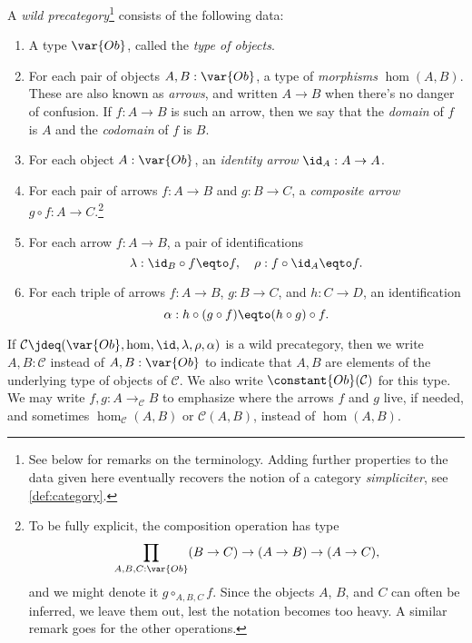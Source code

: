 \begin{definition}\label{def:wild-cat}
  A \emph{wild precategory}\footnote{%
    See below for remarks on the terminology.
    Adding further properties to the data given here eventually
    recovers the notion of a category \emph{simpliciter},
    see \cref{def:category}.}
  consists of the following data:
  \begin{enumerate}
  \item\label{struc:cat-ob} A type $\var{Ob}$, called the \emph{type of objects}.
  \item\label{struc:cat-mor} For each pair of objects $A,B : \var{Ob}$,
    a type of \emph{morphisms} $\hom(A,B)$. These are also known as \emph{arrows},
    and written $A \to B$ when there's no danger of confusion.
    If $f : A \to B$ is such an arrow, then we say that the \emph{domain} of $f$ is $A$
    and the \emph{codomain} of $f$ is $B$.
  \item\label{struc:cat-id} For each object $A : \var{Ob}$,
    an \emph{identity arrow} $\id_A : A \to A$.
  \item\label{struc:cat-comp} For each pair of arrows $f : A \to B$ and $g : B \to C$,
    a \emph{composite arrow} $g\circ f : A \to C$.\footnote{%
      To be fully explicit, the composition operation has
      type
      \[
        \prod_{A,B,C:\var{Ob}}(B \to C) \to (A \to B) \to (A \to C),
      \]
      and we might denote it $g \circ_{A,B,C} f$.
      Since the objects $A$, $B$, and $C$ can often be inferred,
      we leave them out, lest the notation becomes too heavy.
      A similar remark goes for the other operations.}
  \item\label{struc:cat-unit-laws} For each arrow $f : A \to B$,
    a pair of identifications
    \[
      \lambda : \id_B \circ f \eqto f, \quad
      \rho : f \circ \id_A \eqto f.
    \]
  \item\label{struct:cat-assoc} For each triple of arrows
    $f : A \to B$, $g : B \to C$, and $h : C \to D$, an identification
    \[
      \alpha : h \circ (g \circ f) \eqto (h \circ g) \circ f.
    \]
  \end{enumerate}
  If $\mathcal C \jdeq (\var{Ob},\hom,\id,\lambda,\rho,\alpha)$
  is a wild precategory, then we write $A, B : \mathcal C$ instead of $A, B : \var{Ob}$
  to indicate that $A, B$ are elements of the underlying type of objects of $\mathcal C$.
  We also write $\constant{Ob}(\mathcal C)$ for this type.
  We may write $f, g : A \to_{\mathcal C} B$ to emphasize where the arrows $f$ and $g$ live, if needed,
  and sometimes $\hom_{\mathcal C}(A,B)$ or $\mathcal C(A,B)$, instead of $\hom(A,B)$.
\end{definition}
